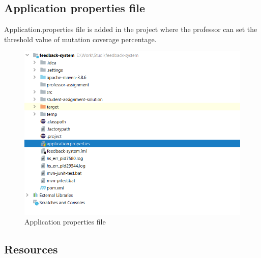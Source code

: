 \subsection{Application properties file}
Application.properties file is added in the project where the professor can set the threshold value of mutation coverage percentage.
\newpage
\begin{figure}[h!]
	\centering
	\includegraphics[scale=1]{fig34.png}
	\caption{Application properties file}
	\label{fig:f11}
\end{figure}
\subsection{Resources}
